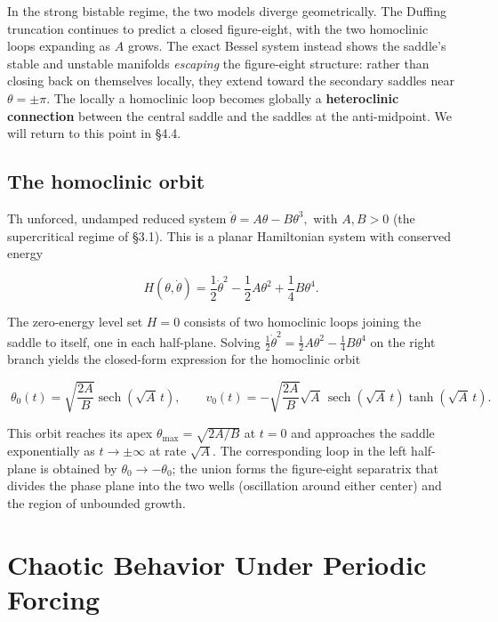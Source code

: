\documentclass[11pt]{article}
\begin{document}
In the strong bistable regime, the two models diverge geometrically. The Duffing truncation continues to predict a closed figure-eight, with the two homoclinic loops expanding as $A$ grows. The exact Bessel system instead shows the saddle's stable and unstable manifolds \textit{escaping} the figure-eight structure: rather than closing back on themselves locally, they extend toward the secondary saddles near $\theta = \pm\pi$. The locally a homoclinic loop becomes globally a \textbf{heteroclinic connection} between the central saddle and the saddles at the anti-midpoint. We will return to this point in §4.4.

\subsection{The homoclinic orbit}

Th unforced, undamped reduced system $\ddot\theta = A\theta - B\theta^3,$ with $A, B > 0$ (the supercritical regime of §3.1). This is a planar Hamiltonian system with conserved energy

\begin{equation}
H(\theta, \dot{\theta}) = \frac{1}{2}\dot{\theta}^2 - \frac{1}{2}A\theta^2 + \frac{1}{4}B\theta^4.
\end{equation}

The zero-energy level set $H = 0$ consists of two homoclinic loops joining the saddle to itself, one in each half-plane. Solving $\frac{1}{2}\dot\theta^2 = \frac{1}{2}A\theta^2 - \frac{1}{4}B\theta^4$ on the right branch yields the closed-form expression for the homoclinic orbit

\begin{equation}
\boxed{\;\theta_0(t) = \sqrt{\frac{2A}{B}}\operatorname{sech}(\sqrt{A}\,t), \qquad v_0(t) = -\sqrt{\frac{2A}{B}}\sqrt{A}\,\operatorname{sech}(\sqrt{A}\,t)\tanh(\sqrt{A}\,t).\;}
\end{equation}

This orbit reaches its apex $\theta_{\max} = \sqrt{2A/B}$ at $t = 0$ and approaches the saddle exponentially as $t \to \pm\infty$ at rate $\sqrt{A}$. The corresponding loop in the left half-plane is obtained by $\theta_0 \to -\theta_0$; the union forms the figure-eight separatrix that divides the phase plane into the two wells (oscillation around either center) and the region of unbounded growth.

\section{Chaotic Behavior Under Periodic Forcing}
\end{document}
